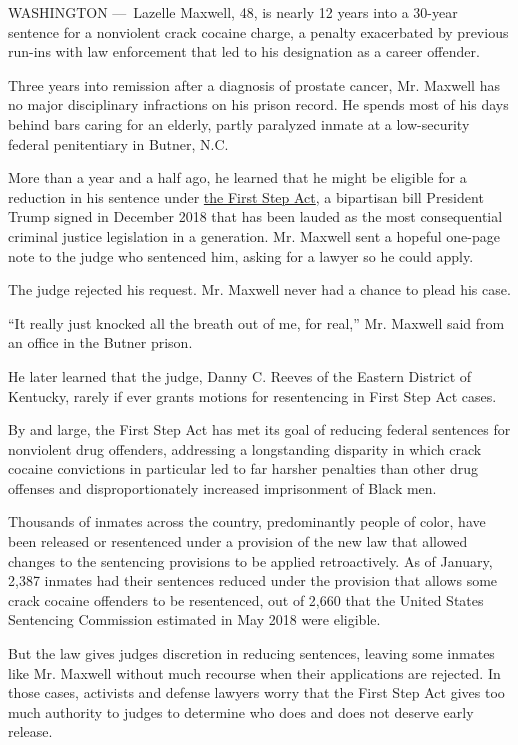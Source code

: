 WASHINGTON ---~Lazelle Maxwell, 48, is nearly 12 years into a 30-year
sentence for a nonviolent crack cocaine charge, a penalty exacerbated by
previous run-ins with law enforcement that led to his designation as a
career offender.

Three years into remission after a diagnosis of prostate cancer, Mr.
Maxwell has no major disciplinary infractions on his prison record. He
spends most of his days behind bars caring for an elderly, partly
paralyzed inmate at a low-security federal penitentiary in Butner, N.C.

More than a year and a half ago, he learned that he might be eligible
for a reduction in his sentence under
\href{https://www.nytimes3xbfgragh.onion/2018/12/14/us/politics/jared-kushner-criminal-justice-bill.html}{the
First Step Act}, a bipartisan bill President Trump signed in December
2018 that has been lauded as the most consequential criminal justice
legislation in a generation. Mr. Maxwell sent a hopeful one-page note to
the judge who sentenced him, asking for a lawyer so he could apply.

The judge rejected his request. Mr. Maxwell never had a chance to plead
his case.

``It really just knocked all the breath out of me, for real,'' Mr.
Maxwell said from an office in the Butner prison.

He later learned that the judge, Danny C. Reeves of the Eastern District
of Kentucky, rarely if ever grants motions for resentencing in First
Step Act cases.

By and large, the First Step Act has met its goal of reducing federal
sentences for nonviolent drug offenders, addressing a longstanding
disparity in which crack cocaine convictions in particular led to far
harsher penalties than other drug offenses and disproportionately
increased imprisonment of Black men.

Thousands of inmates across the country, predominantly people of color,
have been released or resentenced under a provision of the new law that
allowed changes to the sentencing provisions to be applied
retroactively. As of January, 2,387 inmates had their sentences reduced
under the provision that allows some crack cocaine offenders to be
resentenced, out of 2,660 that the United States Sentencing Commission
estimated in May 2018 were eligible.

But the law gives judges discretion in reducing sentences, leaving some
inmates like Mr. Maxwell without much recourse when their applications
are rejected. In those cases, activists and defense lawyers worry that
the First Step Act gives too much authority to judges to determine who
does and does not deserve early release.

